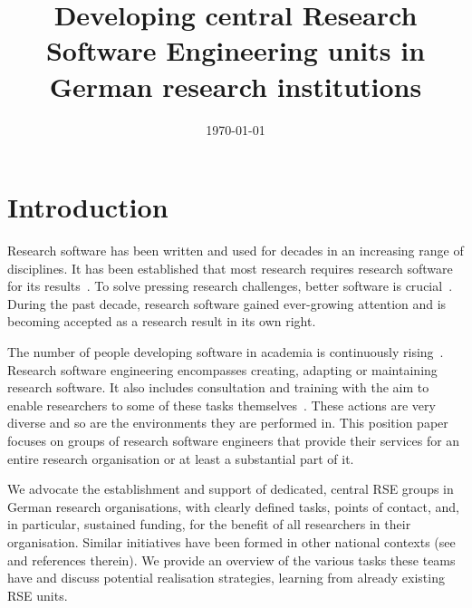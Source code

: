 \documentclass[a4paper]{article}
\title{Developing central Research Software Engineering units in German research institutions}
\date{\today}
\begin{document}
\maketitle


\section{Introduction}
Research software has been written and used for decades in an increasing range of disciplines.
It has been established that most research requires research software for its results~\autocite{Hannay2009, Hettrick2015}.
To solve pressing research challenges, better software is crucial~\autocite{Goble2014}.
During the past decade, research software gained ever-growing attention and is becoming accepted as a research result in its own right.

The number of people developing software in academia is continuously rising~\autocite{Hannay2009, Hettrick2015}.
Research software engineering encompasses creating, adapting or maintaining research software.
It also includes consultation and training with the aim to enable researchers to some of these tasks themselves~\autocite{goth_foundational_competencies_2024}.
These actions are very diverse and so are the environments they are performed in.
This position paper focuses on groups of research software engineers that provide their services for an entire research organisation or at least a substantial part of it.

We advocate the establishment and support of dedicated, central RSE groups in German research organisations, with clearly defined tasks, points of contact, and, in particular, sustained funding, for the benefit of all researchers in their organisation.
Similar initiatives have been formed in other national contexts (see~\autocite{barkerkatz2024,martin2023} and references therein).
We provide an overview of the various tasks these teams have and discuss potential realisation strategies, learning from already existing RSE units.
\end{document}

